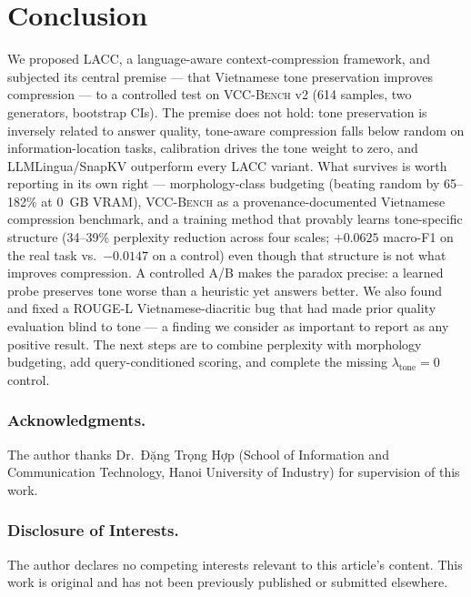 \documentclass[runningheads]{llncs}
\newcommand{\method}[1]{\textsc{#1}}
\begin{document}
\section{Conclusion}

We proposed \method{LACC}, a language-aware context-compression framework, and subjected its central premise --- that Vietnamese tone preservation improves compression --- to a controlled test on \method{VCC-Bench} v2 (614 samples, two generators, bootstrap CIs). The premise does not hold: tone preservation is inversely related to answer quality, tone-aware compression falls below random on information-location tasks, calibration drives the tone weight to zero, and LLMLingua/SnapKV outperform every \method{LACC} variant. What survives is worth reporting in its own right --- morphology-class budgeting (beating random by 65--182\% at 0~GB VRAM), \method{VCC-Bench} as a provenance-documented Vietnamese compression benchmark, and a training method that provably learns tone-specific structure (34--39\% perplexity reduction across four scales; $+0.0625$ macro-F1 on the real task vs.\ $-0.0147$ on a control) even though that structure is not what improves compression. A controlled A/B makes the paradox precise: a learned probe preserves tone worse than a heuristic yet answers better. We also found and fixed a ROUGE-L Vietnamese-diacritic bug that had made prior quality evaluation blind to tone --- a finding we consider as important to report as any positive result. The next steps are to combine perplexity with morphology budgeting, add query-conditioned scoring, and complete the missing $\lambda_{\text{tone}}{=}0$ control.


\begin{credits}
\subsubsection{Acknowledgments.} The author thanks Dr.\ Đặng Trọng Hợp (School of Information and Communication Technology, Hanoi University of Industry) for supervision of this work.
\subsubsection{Disclosure of Interests.} The author declares no competing interests relevant to this article's content. This work is original and has not been previously published or submitted elsewhere.
\end{credits}
\end{document}
